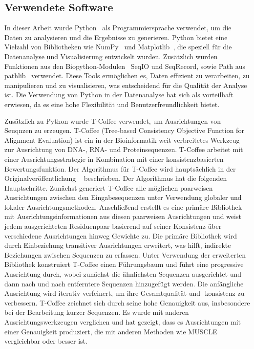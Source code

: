 \documentclass[german,version-2022-01]{uzl-thesis}
\begin{document}
\subsection{Verwendete Software}
In dieser Arbeit wurde Python~\cite{python} als Programmiersprache verwendet, um die Daten zu analysieren und die Ergebnisse zu generieren. Python bietet eine Vielzahl von Bibliotheken wie NumPy~\cite{numpy} und Matplotlib~\cite{matplotlib}, die speziell f\"ur die Datenanalyse und Visualisierung entwickelt wurden. Zus\"atzlich wurden Funktionen aus den Biopython-Modulen~\cite{cock2009biopython} SeqIO und SeqRecord, sowie Path aus pathlib~\cite{pathlib} verwendet. Diese Tools erm\"oglichen es, Daten effizient zu verarbeiten, zu manipulieren und zu visualisieren, was entscheidend f\"ur die Qualit\"at der Analyse ist. Die Verwendung von Python in der Datenanalyse hat sich als vorteilhaft erwiesen, da es eine hohe Flexibilit\"at und Benutzerfreundlichkeit bietet.

Zus\"atzlich zu Python wurde T-Coffee verwendet, um Ausrichtungen von Seuqnzen zu erzeugen. T-Coffee (Tree-based Consistency Objective Function for Alignment Evaluation) ist ein in der Bioinformatik weit verbreitetes Werkzeug zur Ausrichtung von DNA-, RNA- und Proteinsequenzen. T-Coffee arbeitet mit einer Ausrichtungsstrategie in Kombination mit einer konsistenzbasierten Bewertungsfunktion. Der Algorithmus f\"ur T-Coffee wird haupts\"achlich in der Originalver\"offentlichung ~\cite{poirot_tcoffeeigs_2003} beschrieben. Der Algorithmus hat die folgenden Hauptschritte. Zun\"achst generiert T-Coffee alle m\"oglichen paarweisen Ausrichtungen zwischen den Eingabesequenzen unter Verwendung globaler und lokaler Ausrichtungsmethoden. Anschlie\ss{}end erstellt es eine prim\"are Bibliothek mit Ausrichtungsinformationen aus diesen paarweisen Ausrichtungen und weist jedem ausgerichteten Residuenpaar basierend auf seiner Konsistenz \"uber verschiedene Ausrichtungen hinweg Gewichte zu. Die prim\"are Bibliothek wird durch Einbeziehung transitiver Ausrichtungen erweitert, was hilft, indirekte Beziehungen zwischen Sequenzen zu erfassen. Unter Verwendung der erweiterten Bibliothek konstruiert T-Coffee einen F\"uhrungsbaum und f\"uhrt eine progressive Ausrichtung durch, wobei zun\"achst die \"ahnlichsten Sequenzen ausgerichtet und dann nach und nach entferntere Sequenzen hinzugef\"ugt werden. Die anf\"angliche Ausrichtung wird iterativ verfeinert, um ihre Gesamtqualit\"at und -konsistenz zu verbessern.
T-Coffee zeichnet sich durch seine hohe Genauigkeit aus, insbesondere bei der Bearbeitung kurzer Sequenzen. Es wurde mit anderen Ausrichtungswerkzeugen verglichen und hat gezeigt, dass es Ausrichtungen mit einer Genauigkeit produziert, die mit anderen Methoden wie MUSCLE~\cite{Edgar2004MUSCLEL} vergleichbar oder besser ist.
\end{document}
